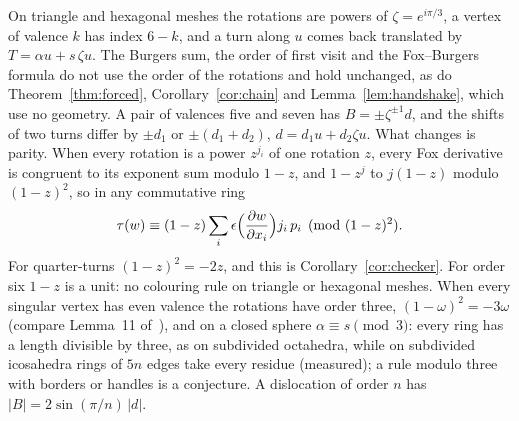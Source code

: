 \documentclass[11pt,a4paper]{article}
\newcommand{\shift}{s}
\begin{document}
On triangle and hexagonal meshes the rotations are powers of $\zeta =
e^{i\pi/3}$, a vertex of valence $k$ has index $6 - k$, and a turn along $u$
comes back translated by $T = \alpha u + \shift\, \zeta u$.
The Burgers sum, the order of first visit and the Fox--Burgers formula do not
use the order of the rotations and hold unchanged, as do
Theorem~\ref{thm:forced}, Corollary~\ref{cor:chain} and
Lemma~\ref{lem:handshake}, which use no geometry. A pair of valences five and seven has $B =
\pm\zeta^{\pm1} d$, and the shifts of two turns differ by $\pm d_1$ or
$\pm(d_1 + d_2)$, $d = d_1 u + d_2 \zeta u$. What changes is parity. When every
rotation is a power $z^{j_i}$ of one rotation $z$, every Fox derivative is
congruent to its exponent sum modulo $1 - z$, and $1 - z^j$ to $j(1 - z)$
modulo $(1 - z)^2$, so in any commutative ring
\[
  \tau(w) \equiv (1 - z) \sum_i \epsilon\Bigl(\frac{\partial w}{\partial
  x_i}\Bigr) j_i\, p_i \pmod{(1 - z)^2}.
\]
For quarter-turns $(1 - z)^2 = -2z$, and this is Corollary~\ref{cor:checker}.
For order six $1 - z$ is a unit: no colouring rule on triangle or hexagonal
meshes. When every singular vertex has even valence the rotations have order
three, $(1 - \omega)^2 = -3\omega$ (compare Lemma~11
of~\cite{izmestiev2013torus}), and on a closed sphere $\alpha \equiv \shift
\pmod 3$: every ring has a length divisible by three, as on subdivided
octahedra, while on subdivided icosahedra rings of $5n$ edges take every
residue (measured); a rule modulo three with borders or handles is a
conjecture. A dislocation of order $n$ has $|B| = 2\sin(\pi/n)\,|d|$.
\end{document}
